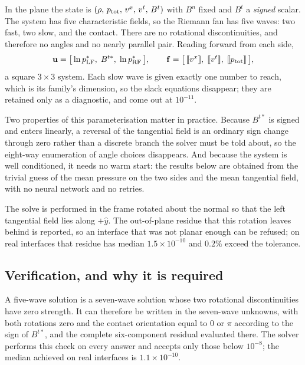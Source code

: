 In the plane the state is $(\rho,\,p_{\rm tot},\,v^x,\,v^t,\,B^t)$ with $B^n$
fixed and $B^t$ a \emph{signed} scalar. The system has five characteristic
fields, so the Riemann fan has five waves: two fast, two slow, and the
contact. There are no rotational discontinuities, and therefore no angles and
no nearly parallel pair. Reading forward from each side,
%
\begin{equation}
  \mathbf{u} = \bigl[\, \ln p^\ast_{\mathrm{LF}},\;
                        B^{t\ast},\;
                        \ln p^\ast_{\mathrm{RF}} \,\bigr],
  \qquad
  \mathbf{f} = \bigl[\, \llbracket v^x \rrbracket,\;
                        \llbracket v^t \rrbracket,\;
                        \llbracket p_{\rm tot} \rrbracket \,\bigr],
  \label{eq:planar-system}
\end{equation}
%
a square $3 \times 3$ system. Each slow wave is given exactly one number to
reach, which is its family's dimension, so the slack equations disappear;
they are retained only as a diagnostic, and come out at $10^{-11}$.

Two properties of this parameterisation matter in practice. Because
$B^{t\ast}$ is signed and enters linearly, a reversal of the tangential field
is an ordinary sign change through zero rather than a discrete branch the
solver must be told about, so the eight-way enumeration of angle choices
disappears. And because the system is well conditioned, it needs no warm
start: the results below are obtained from the trivial guess of the mean
pressure on the two sides and the mean tangential field, with no neural
network and no retries.

The solve is performed in the frame rotated about the normal so that the left
tangential field lies along $+\hat{y}$. The out-of-plane residue that this
rotation leaves behind is reported, so an interface that was not planar
enough can be refused; on real interfaces that residue has median $1.5 \times 10^{-10}$ and $0.2\%$ exceed the
tolerance.

\subsection{Verification, and why it is required}
\label{sec:planar:verify}

A five-wave solution is a seven-wave solution whose two rotational
discontinuities have zero strength. It can therefore be written in the
seven-wave unknowns, with both rotations zero and the contact orientation
equal to $0$ or $\pi$ according to the sign of $B^{t\ast}$, and the complete
six-component residual evaluated there. The solver performs this check on
every answer and accepts only those below $10^{-8}$; the median achieved on
real interfaces is $1.1 \times 10^{-10}$.

